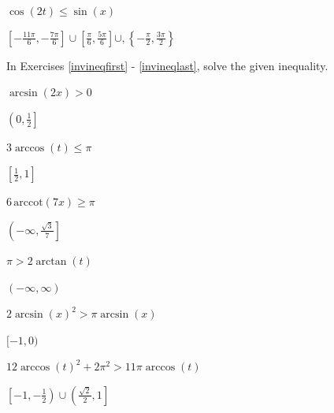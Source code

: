 \documentclass{ximera}
\begin{document}
\begin{question}
\begin{problem} \label{thirdineqlast}
$\cos(2t) \leq \sin(x)$

\begin{solution}
$\left[ -\frac{11\pi}{6},  -\frac{7\pi}{6} \right] \cup \left[ \frac{\pi}{6}, \frac{5\pi}{6} \right] \cup, \left\{ -\frac{\pi}{2}, \frac{3\pi}{2} \right\}$
\end{solution}
\end{problem}

\end{question}

\begin{question}
In Exercises \ref{invineqfirst} - \ref{invineqlast}, solve the given inequality.

\begin{problem}  \label{invineqfirst} 
$\arcsin(2x) > 0$

\begin{solution}
$\left(0, \frac{1}{2}\right]$
\end{solution}
\end{problem}

\begin{problem}
$3 \arccos(t) \leq \pi$

\begin{solution}
$\left[\frac{1}{2}, 1\right]$
\end{solution}
\end{problem}

\begin{problem}
$6 \, \text{arccot}(7x) \geq \pi$

\begin{solution}
$\left(-\infty, \frac{\sqrt{3}}{7} \right]$
\end{solution}
\end{problem}

\begin{problem}
$\pi > 2\arctan(t)$

\begin{solution}
$(-\infty, \infty)$
\end{solution}
\end{problem}

\begin{problem}
$2\arcsin(x)^2 > \pi \arcsin(x)$

\begin{solution}
$[-1,0)$
\end{solution}
\end{problem}

\begin{problem} \label{invineqlast} 
$12 \arccos(t)^2+2\pi^2>11\pi \arccos(t)$

\begin{solution}
$\left[-1, -\frac{1}{2}\right) \cup \left( \frac{\sqrt{2}}{2}, 1\right]$
\end{solution}
\end{problem}

\end{question}
\end{document}
